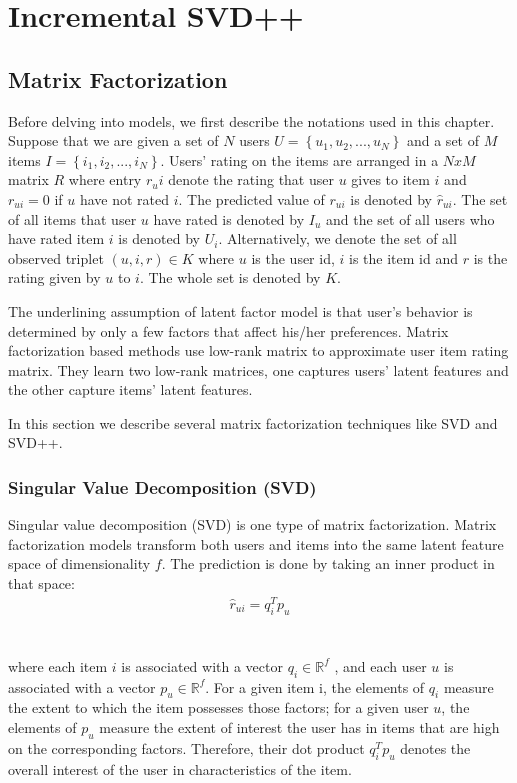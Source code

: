 \documentclass[oneside,13pt]{extreport}
\begin{document}
\chapter{Incremental SVD++}
\label{ISVD++_chapter}

\section{Matrix Factorization}
Before delving into models, we first describe the notations used in this chapter. Suppose that we are given
a set of $N$ users $U = \left\{ {{u_1},{u_2},...,{u_N}} \right\}$ and a set of $M$ items $I = \left\{ {{i_1},{i_2},...,{i_N}} \right\}$. Users’ rating on the items are arranged in a $NxM$ matrix $R$ where entry $r_ui$ denote the rating that user $u$ gives to item $i$ and $r_{ui} = 0$ if $u$ have not rated $i$. The predicted value of $r_{ui}$ is denoted by $\hat r_{ui}$. The set of all items that user $u$
have rated is denoted by $I_u$ and the set of all users who have rated item $i$ is denoted by $U_i$. Alternatively, we denote the set of all observed
triplet $\left( {u,i,r} \right) \in K$  where $u$ is the user id, $i$ is the item id
and $r$ is the rating given by $u$ to $i$. The whole set is denoted by $K$. 

The underlining assumption of latent factor model is that user’s behavior is determined by only a few factors that affect his/her preferences. Matrix factorization based methods use low-rank matrix
to approximate user item rating matrix. They learn two low-rank matrices, one captures users’ latent features and the other capture items’ latent features.

In this section we describe several matrix factorization techniques like SVD and SVD++.

\subsection{Singular Value Decomposition (SVD)}
Singular value decomposition (SVD) is one type of matrix factorization. Matrix factorization models transform both users and items into the same latent feature space of dimensionality $f$. The prediction is done by taking an inner product in that space: 
\begin{eqnarray}
\label{eq:MF_predict}
{\hat r_{ui}} = q_i^T{p_u} 
\end{eqnarray}
\\\\
where each item $i$ is associated with a vector ${q_i} \in {\mathbb{R}^f}$ , and each user $u$ is associated with a vector ${p_u} \in {\mathbb{R}^f}$. For a given item i, the elements of $q_i$
measure the extent to which the item possesses those factors; for a given user $u$, the elements of $p_u$ measure the extent of interest the user has in items that are high on the corresponding factors. Therefore, their dot product $q_i^T{p_u}$ denotes the overall interest of the user in characteristics of the item.
\end{document}
